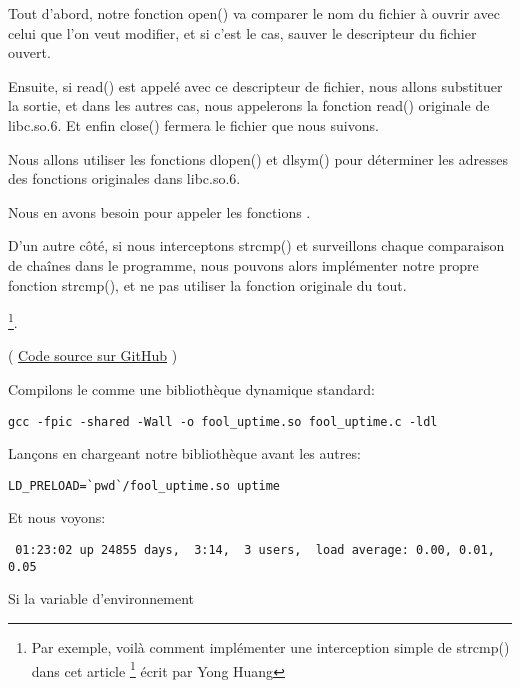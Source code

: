 Tout d'abord, notre fonction open() va comparer le nom du fichier à ouvrir avec celui que l'on veut modifier,
et si c'est le cas, sauver le descripteur du fichier ouvert.

Ensuite, si read() est appelé avec ce descripteur de fichier, nous allons substituer la sortie,
et dans les autres cas, nous appelerons la fonction read() originale de libc.so.6.
Et enfin close() fermera le fichier que nous suivons.


Nous allons utiliser les fonctions dlopen() et dlsym() pour déterminer les adresses des fonctions originales dans libc.so.6.

Nous en avons besoin pour appeler les fonctions .


D'un autre côté, si nous interceptons strcmp() et surveillons chaque comparaison de
chaînes dans le programme, nous pouvons alors implémenter notre propre fonction strcmp(),
et ne pas utiliser la fonction originale du tout.

\footnote{Par exemple, voilà comment implémenter une interception simple de strcmp() dans cet article
\footnote{\href{http://go.yurichev.com/17143}{yurichev.com}}
écrit par Yong Huang}.


( \href{https://github.com/DennisYurichev/RE-for-beginners/blob/master/OS/LD_PRELOAD/fool_uptime.c}{Code source sur GitHub} )

Compilons le comme une bibliothèque dynamique standard:

\begin{lstlisting}
gcc -fpic -shared -Wall -o fool_uptime.so fool_uptime.c -ldl
\end{lstlisting}

Lançons 
en chargeant notre bibliothèque avant les autres:

\begin{lstlisting}
LD_PRELOAD=`pwd`/fool_uptime.so uptime
\end{lstlisting}

Et nous voyons:

\begin{lstlisting}
 01:23:02 up 24855 days,  3:14,  3 users,  load average: 0.00, 0.01, 0.05
\end{lstlisting}

Si la variable d'environnement 

